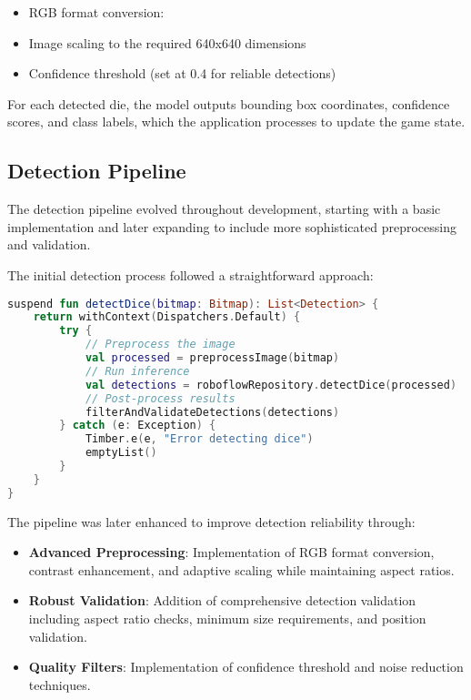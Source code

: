 \begin{itemize}
    \item RGB format conversion: 
    \item Image scaling to the required 640x640 dimensions
    \item Confidence threshold (set at 0.4 for reliable detections)
\end{itemize} 

For each detected die, the model outputs bounding box coordinates, confidence scores, and class labels, which the application processes to update the game state.

\subsection{Detection Pipeline}

The detection pipeline evolved throughout development, starting with a basic implementation and later expanding to include more sophisticated preprocessing and validation.

The initial detection process followed a straightforward approach:
\begin{lstlisting}[language=Kotlin, caption={Initial Dice Detection Pipeline}, label=lst:initial_dice_detection]
suspend fun detectDice(bitmap: Bitmap): List<Detection> {
    return withContext(Dispatchers.Default) {
        try {
            // Preprocess the image
            val processed = preprocessImage(bitmap)
            // Run inference
            val detections = roboflowRepository.detectDice(processed)
            // Post-process results
            filterAndValidateDetections(detections)
        } catch (e: Exception) {
            Timber.e(e, "Error detecting dice")
            emptyList()
        }
    }
}
\end{lstlisting}

The pipeline was later enhanced to improve detection reliability through:
\begin{itemize}
    \item \textbf{Advanced Preprocessing}: Implementation of RGB format conversion, contrast enhancement, and adaptive scaling while maintaining aspect ratios.
    \item \textbf{Robust Validation}: Addition of comprehensive detection validation including aspect ratio checks, minimum size requirements, and position validation.
    \item \textbf{Quality Filters}: Implementation of confidence threshold and noise reduction techniques.
\end{itemize}

